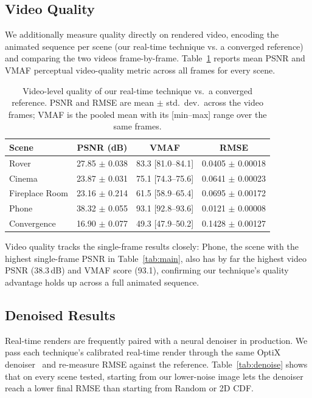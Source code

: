 \documentclass[acmtog,review,anonymous]{acmart}
\begin{document}
\subsection{Video Quality}
\label{sec:video}
We additionally measure quality directly on rendered video, encoding the 
animated sequence per scene (our real-time technique vs. a converged reference) and
comparing the two videos frame-by-frame. Table~\ref{tab:video} reports mean PSNR and VMAF perceptual video-quality metric across all frames for every scene.

\begin{table}[t]
\centering
\small
\caption{Video-level quality of our real-time technique vs.\ a converged reference. PSNR and RMSE are mean $\pm$ std.\ dev.\ across the video frames; VMAF is the pooled mean with its [min--max] range over the same frames.}
\label{tab:video}
\begin{tabular}{l c c c}
\toprule
Scene & PSNR (dB) & VMAF & RMSE \\
\midrule
Rover & 27.85 $\pm$ 0.038 & 83.3 [81.0--84.1] & 0.0405 $\pm$ 0.00018 \\
Cinema & 23.87 $\pm$ 0.031 & 75.1 [74.3--75.6] & 0.0641 $\pm$ 0.00023 \\
Fireplace Room & 23.16 $\pm$ 0.214 & 61.5 [58.9--65.4] & 0.0695 $\pm$ 0.00172 \\
Phone & 38.32 $\pm$ 0.055 & 93.1 [92.8--93.6] & 0.0121 $\pm$ 0.00008 \\
Convergence & 16.90 $\pm$ 0.077 & 49.3 [47.9--50.2] & 0.1428 $\pm$ 0.00127 \\
\bottomrule
\end{tabular}
\end{table}


Video quality tracks the single-frame results closely: Phone, the scene with the highest
single-frame PSNR in Table~\ref{tab:main}, also has by far the highest video PSNR (38.3\,dB)
and VMAF score (93.1), confirming our technique's quality advantage holds up across a full
animated sequence.


\subsection{Denoised Results}
\label{sec:denoise}
Real-time renders are frequently paired with a neural denoiser in production. We pass each
technique's calibrated real-time render through the same OptiX denoiser~\cite{nvidia2021optixdenoiser} and re-measure
RMSE against the reference. Table~\ref{tab:denoise} shows that on every scene tested,
starting from our lower-noise image lets the denoiser reach a lower final RMSE than starting
from Random or 2D CDF.
\end{document}
